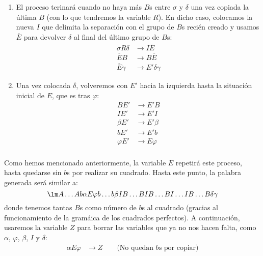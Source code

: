 \begin{ejercicio}
\begin{enumerate}
\begin{enumerate}
                \item El proceso terinará cuando no haya más $B$s entre $\sigma$ y $\delta$ una vez copiada la última $B$ (con lo que tendremos la variable $R$). En dicho caso, colocamos la nueva $I$ que delimita la separación con el grupo de $B$s recién creado y usamos $\overline{E}$ para devolver $\delta$ al final del último grupo de $B$s:
                    \begin{align*}
                        \sigma R\delta &\rightarrow I\overline{E} \\
                        \overline{E}B &\rightarrow B\overline{E} \\
                        \overline{E}\gamma &\rightarrow E'\delta\gamma
                    \end{align*}
                \item Una vez colocada $\delta$, volveremos con $E'$ hacia la izquierda hasta la situación inicial de $E$, que es tras $\varphi$:
                    \begin{align*}
                        BE' &\rightarrow E'B \\
                        IE' &\rightarrow E'I \\
                        \beta E' &\rightarrow E'\beta \\
                        bE' &\rightarrow E'b \\
                        \varphi E' &\rightarrow E\varphi \\
                    \end{align*}
            \end{enumerate}
            Como hemos mencionado anteriormente, la variable $E$ repetirá este proceso, hasta quedarse sin $b$s por realizar su cuadrado. Hasta este punto, la palabra generada será similar a:
            \begin{equation*}
                \lm A\ldots Ab \alpha E\varphi b\ldots b\beta IB\ldots BIB\ldots BI \ldots I B \ldots B \delta\gamma
            \end{equation*}
            donde tenemos tantas $B$s como número de $b$s al cuadrado (gracias al funcionamiento de la gramáica de los cuadrados perfectos). A continuación, usaremos la variable $Z$ para borrar las variables que ya no nos hacen falta, como $\alpha$, $\varphi$, $\beta$, $I$ y $\delta$:
            \begin{align*}
                \alpha E\varphi &\rightarrow Z \qquad \text{(No quedan $b$s por copiar)} \\

\end{align*}
\end{enumerate}
\end{ejercicio}

